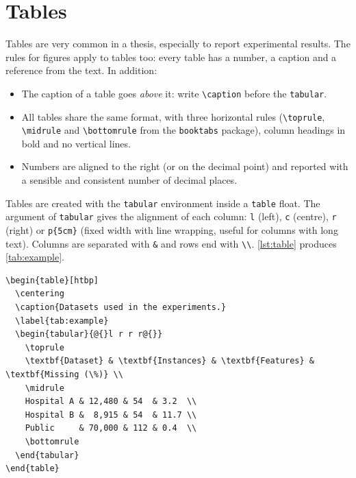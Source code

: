 \section{Tables}\label{sec:tables}

Tables are very common in a thesis, especially to report experimental results. The rules for
figures apply to tables too: every table has a number, a caption and a reference from the
text. In addition:

\begin{itemize}
  \item The caption of a table goes \emph{above} it: write \verb|\caption| before the
        \texttt{tabular}.
  \item All tables share the same format, with three horizontal rules (\verb|\toprule|,
        \verb|\midrule| and \verb|\bottomrule| from the \texttt{booktabs} package), column
        headings in bold and no vertical lines.
  \item Numbers are aligned to the right (or on the decimal point) and reported with a
        sensible and consistent number of decimal places.
\end{itemize}

Tables are created with the \texttt{tabular} environment inside a \texttt{table} float. The
argument of \texttt{tabular} gives the alignment of each column: \texttt{l} (left),
\texttt{c} (centre), \texttt{r} (right) or \texttt{p\{5cm\}} (fixed width with line
wrapping, useful for columns with long text). Columns are separated with \verb|&| and rows
end with \verb|\\|. \autoref{lst:table} produces \autoref{tab:example}.

\begin{lstlisting}[language={[LaTeX]TeX}, caption={Creating a table.}, label=lst:table]
\begin{table}[htbp]
  \centering
  \caption{Datasets used in the experiments.}
  \label{tab:example}
  \begin{tabular}{@{}l r r r@{}}
    \toprule
    \textbf{Dataset} & \textbf{Instances} & \textbf{Features} & \textbf{Missing (\%)} \\
    \midrule
    Hospital A & 12,480 & 54  & 3.2  \\
    Hospital B &  8,915 & 54  & 11.7 \\
    Public     & 70,000 & 112 & 0.4  \\
    \bottomrule
  \end{tabular}
\end{table}
\end{lstlisting}

